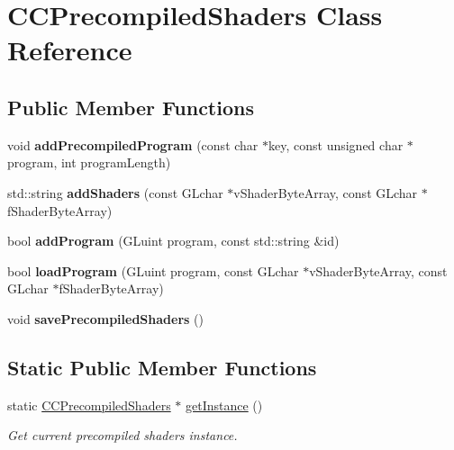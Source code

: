\hypertarget{classCCPrecompiledShaders}{}\section{C\+C\+Precompiled\+Shaders Class Reference}
\label{classCCPrecompiledShaders}
\subsection*{Public Member Functions}
\begin{DoxyCompactItemize}
\item 
\mbox{\label{classCCPrecompiledShaders_ad27f44fa8d55ced8b258d2ffdf6cfbd0}} 
void {\bfseries add\+Precompiled\+Program} (const char $\ast$key, const unsigned char $\ast$program, int program\+Length)
\item 
\mbox{\label{classCCPrecompiledShaders_a2716c09259d0e26aa249a93e0ea898cd}} 
std\+::string {\bfseries add\+Shaders} (const G\+Lchar $\ast$v\+Shader\+Byte\+Array, const G\+Lchar $\ast$f\+Shader\+Byte\+Array)
\item 
\mbox{\label{classCCPrecompiledShaders_ace055fa3546e68020f7827e07ecc4656}} 
bool {\bfseries add\+Program} (G\+Luint program, const std\+::string \&id)
\item 
\mbox{\label{classCCPrecompiledShaders_af3fa9be4bc5ef19bac089e4463630dd4}} 
bool {\bfseries load\+Program} (G\+Luint program, const G\+Lchar $\ast$v\+Shader\+Byte\+Array, const G\+Lchar $\ast$f\+Shader\+Byte\+Array)
\item 
\mbox{\label{classCCPrecompiledShaders_a26e97895c833ca2d9c9db6a0be8ed883}} 
void {\bfseries save\+Precompiled\+Shaders} ()
\end{DoxyCompactItemize}
\subsection*{Static Public Member Functions}
\begin{DoxyCompactItemize}
\item 
static \hyperlink{classCCPrecompiledShaders}{C\+C\+Precompiled\+Shaders} $\ast$ \hyperlink{classCCPrecompiledShaders_a58b4d02e74636859e43b15772acad36e}{get\+Instance} ()
\begin{DoxyCompactList}\small\item\em Get current precompiled shaders instance. \end{DoxyCompactList}\end{DoxyCompactItemize}
